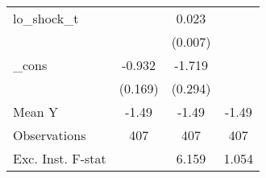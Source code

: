 {\begin{tabular}{l*{3}{c}}
\addlinespace
lo\_shock\_t  &                     &       0.023\sym{***}&                     \\
            &                     &     (0.007)         &                     \\
\addlinespace
\_cons      &      -0.932\sym{***}&      -1.719\sym{***}&                     \\
            &     (0.169)         &     (0.294)         &                     \\
\midrule
Mean Y      &       -1.49         &       -1.49         &       -1.49         \\
Observations&         407         &         407         &         407         \\
Exc. Inst. F-stat&                     &       6.159         &       1.054         \\
\bottomrule
\end{tabular}
}
